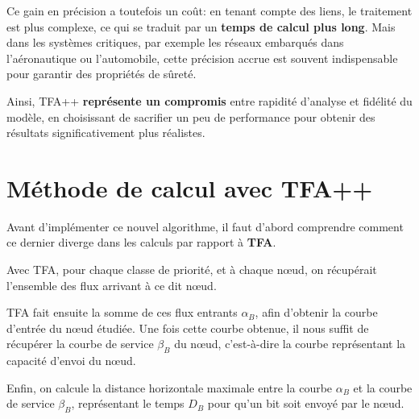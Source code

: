 \documentclass[12pt]{report}
\begin{document}
\bigskip

Ce gain en précision a toutefois un coût: en tenant compte des 
liens, le traitement est plus complexe, ce qui se traduit 
par un \textbf{temps de calcul plus long}. Mais dans les 
systèmes critiques, par exemple les réseaux embarqués dans 
l'aéronautique ou l'automobile, cette précision accrue est 
souvent indispensable pour garantir des propriétés de sûreté.

\bigskip

Ainsi, TFA++ \textbf{représente un compromis} entre rapidité 
d'analyse et fidélité du modèle, en choisissant de 
sacrifier un peu de performance pour obtenir des résultats 
significativement plus réalistes.

\break{}

\section{Méthode de calcul avec TFA++}

Avant d'implémenter ce nouvel algorithme, il faut d'abord
comprendre comment ce dernier diverge dans les calculs par
rapport à \textbf{TFA}.

\bigskip

Avec TFA, pour chaque classe de priorité, et à chaque nœud,
on récupérait l'ensemble des flux arrivant à ce dit nœud.

\smallskip

TFA fait ensuite la somme de ces flux entrants $\alpha_B$, afin d'obtenir la 
courbe d'entrée du nœud étudiée. Une fois cette courbe obtenue,
il nous suffit de récupérer la courbe de service $\beta_B$ du nœud,
c'est-à-dire la courbe représentant la capacité d'envoi du nœud.

\smallskip

Enfin, on calcule la distance horizontale maximale entre la courbe $\alpha_B$
et la courbe de service $\beta_B$, représentant le temps $D_B$ pour qu'un bit
soit envoyé par le nœud.

\bigskip

\vspace{0.5cm}
\end{document}
